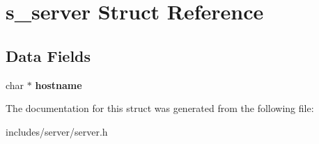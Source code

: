 \hypertarget{structs__server}{}\section{s\+\_\+server Struct Reference}
\label{structs__server}
\subsection*{Data Fields}
\begin{DoxyCompactItemize}
\item 
\hypertarget{structs__server_af203df082d5c6dcaa0c88b07cf86466d}{}char $\ast$ {\bfseries hostname}\label{structs__server_af203df082d5c6dcaa0c88b07cf86466d}

\end{DoxyCompactItemize}


The documentation for this struct was generated from the following file\+:\begin{DoxyCompactItemize}
\item 
includes/server/server.\+h\end{DoxyCompactItemize}
